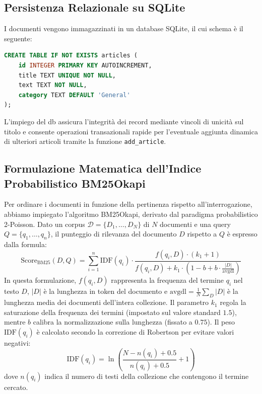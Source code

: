 \subsection{Persistenza Relazionale su SQLite}
I documenti vengono immagazzinati in un database SQLite, il cui schema è il seguente:
\begin{lstlisting}[language=SQL]
CREATE TABLE IF NOT EXISTS articles (
    id INTEGER PRIMARY KEY AUTOINCREMENT,
    title TEXT UNIQUE NOT NULL,
    text TEXT NOT NULL,
    category TEXT DEFAULT 'General'
);
\end{lstlisting}
L'impiego del db assicura l'integrità dei record mediante vincoli di unicità sul titolo e consente operazioni transazionali rapide per l'eventuale aggiunta dinamica di ulteriori articoli tramite la funzione \texttt{add\_article}.

\subsection{Formulazione Matematica dell'Indice Probabilistico BM25Okapi}
Per ordinare i documenti in funzione della pertinenza rispetto all'interrogazione, abbiamo impiegato l'algoritmo BM25Okapi, derivato dal paradigma probabilistico 2-Poisson. Dato un corpus $\mathcal{D} = \{D_1, \dots, D_N\}$ di $N$ documenti e una query $Q = \{q_1, \dots, q_n\}$, il punteggio di rilevanza del documento $D$ rispetto a $Q$ è espresso dalla formula:
\begin{equation}
\text{Score}_{\text{BM25}}(D, Q) = \sum_{i=1}^n \text{IDF}(q_i) \cdot \frac{f(q_i, D) \cdot (k_1 + 1)}{f(q_i, D) + k_1 \cdot \left(1 - b + b \cdot \frac{|D|}{\text{avgdl}}\right)}
\end{equation}
In questa formulazione, $f(q_i, D)$ rappresenta la frequenza del termine $q_i$ nel testo $D$, $|D|$ è la lunghezza in token del documento e $\text{avgdl} = \frac{1}{N} \sum_{D} |D|$ è la lunghezza media dei documenti dell'intera collezione. Il parametro $k_1$ regola la saturazione della frequenza dei termini (impostato sul valore standard $1.5$), mentre $b$ calibra la normalizzazione sulla lunghezza (fissato a $0.75$). Il peso $\text{IDF}(q_i)$ è calcolato secondo la correzione di Robertson per evitare valori negativi:
\begin{equation}
\text{IDF}(q_i) = \ln \left( \frac{N - n(q_i) + 0.5}{n(q_i) + 0.5} + 1 \right)
\end{equation}
dove $n(q_i)$ indica il numero di testi della collezione che contengono il termine cercato.

